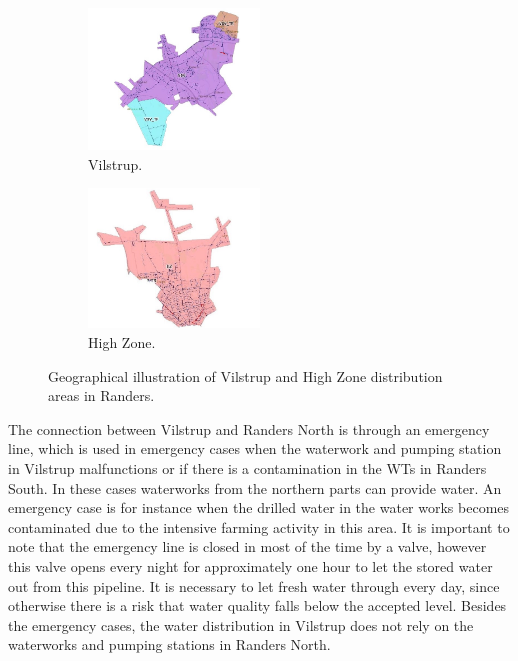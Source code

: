 \begin{figure}[H]
\centering
\begin{subfigure}{.49\textwidth}
\centering
\includegraphics[width=0.5\textwidth]{report/pictures/Vilstrup_region}
  \caption{Vilstrup.}
  \label{fig:vilstrup_region}
\end{subfigure}
\begin{subfigure}{.49\textwidth}
\centering
\includegraphics[width=0.5\textwidth]{report/pictures/Highzone_region}
  \caption{High Zone.}
  \label{fig:highzone_region}
\end{subfigure}
\caption{Geographical illustration of Vilstrup and High Zone distribution areas in Randers.}
\label{fig:vsv_hz_pic}
\end{figure}

\vspace{-3mm}


The connection between Vilstrup and Randers North is through an emergency line, which is  used in emergency cases when the waterwork and pumping station in Vilstrup malfunctions or if there is a contamination in the WTs in Randers South. In these cases waterworks from the northern parts can provide water. An emergency case is for instance when the drilled water in the water works becomes contaminated due to the intensive farming activity in this area. It is important to note that the emergency line is closed in most of the time by a valve, however this valve opens every night for approximately one hour to let the stored water out from this pipeline. It is necessary to let fresh water through every day, since otherwise there is a risk that water quality falls below the accepted level. Besides the emergency cases, the  water distribution in Vilstrup does not rely on the waterworks and pumping stations in Randers North.  

